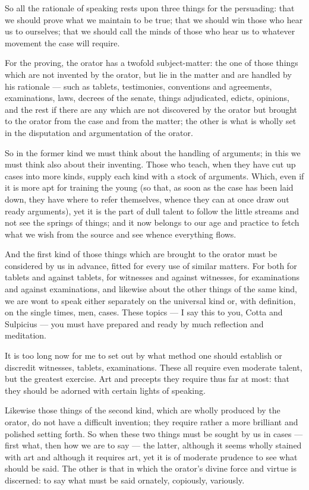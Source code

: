  So all the rationale of speaking rests upon three things for the persuading: that we should prove what we maintain to be true; that we should win those who hear us to ourselves; that we should call the minds of those who hear us to whatever movement the case will require.

 For the proving, the orator has a twofold subject-matter: the one of those things which are not invented by the orator, but lie in the matter and are handled by his rationale — such as tablets, testimonies, conventions and agreements, examinations, laws, decrees of the senate, things adjudicated, edicts, opinions, and the rest if there are any which are not discovered by the orator but brought to the orator from the case and from the matter; the other is what is wholly set in the disputation and argumentation of the orator.

 So in the former kind we must think about the handling of arguments; in this we must think also about their inventing. Those who teach, when they have cut up cases into more kinds, supply each kind with a stock of arguments. Which, even if it is more apt for training the young (so that, as soon as the case has been laid down, they have where to refer themselves, whence they can at once draw out ready arguments), yet it is the part of dull talent to follow the little streams and not see the springs of things; and it now belongs to our age and practice to fetch what we wish from the source and see whence everything flows.

 And the first kind of those things which are brought to the orator must be considered by us in advance, fitted for every use of similar matters. For both for tablets and against tablets, for witnesses and against witnesses, for examinations and against examinations, and likewise about the other things of the same kind, we are wont to speak either separately on the universal kind or, with definition, on the single times, men, cases. These topics — I say this to you, Cotta and Sulpicius — you must have prepared and ready by much reflection and meditation.

 It is too long now for me to set out by what method one should establish or discredit witnesses, tablets, examinations. These all require even moderate talent, but the greatest exercise. Art and precepts they require thus far at most: that they should be adorned with certain lights of speaking.

 Likewise those things of the second kind, which are wholly produced by the orator, do not have a difficult invention; they require rather a more brilliant and polished setting forth. So when these two things must be sought by us in cases — first what, then how we are to say — the latter, although it seems wholly stained with art and although it requires art, yet it is of moderate prudence to see what should be said. The other is that in which the orator's divine force and virtue is discerned: to say what must be said ornately, copiously, variously.

